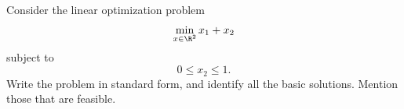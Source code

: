 
Consider the linear optimization problem
\[
\min_{x \in \R^2} x_1 + x_2
\]
subject to
\[
0 \leq x_2 \leq 1.
\]
Write the problem in standard form, and identify all the basic
solutions. Mention those that are feasible.




